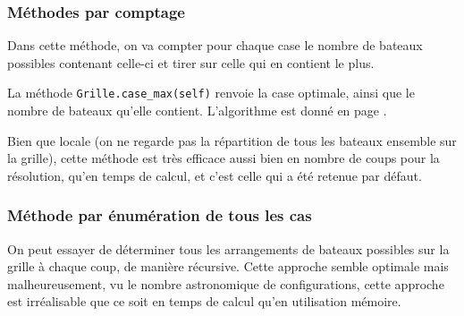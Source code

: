 \subsubsection{Méthodes par comptage}
Dans cette méthode, on va compter pour chaque case le nombre de bateaux possibles contenant celle-ci et tirer sur celle qui en contient le plus.

La méthode \texttt{Grille.case\_max(self)} renvoie la case optimale, ainsi que le nombre de bateaux qu'elle contient. L'algorithme est donné en page \pageref{case_max}.



Bien que locale (on ne regarde pas la répartition de tous les bateaux ensemble sur la grille), cette méthode est très efficace aussi bien en nombre de coups pour la résolution, qu'en temps de calcul, et c'est celle qui a été retenue par défaut. 


\subsubsection{Méthode par énumération de tous les cas}

On peut essayer de déterminer tous les arrangements de bateaux possibles sur la grille à chaque coup, de manière récursive. Cette approche semble optimale mais malheureusement, vu le nombre astronomique de configurations, cette approche est irréalisable que ce soit en temps de calcul qu'en utilisation mémoire.

